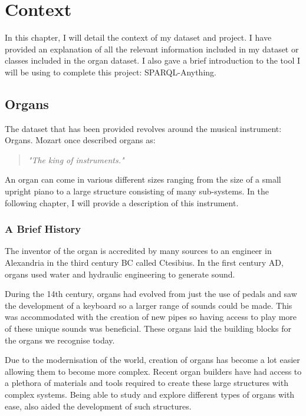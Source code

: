 \chapter{Context}
In this chapter, I will detail the context of my dataset and project. I have provided an explanation of all the relevant information included in my dataset or classes included in the organ dataset. I also gave a brief introduction to the tool I will be using to complete this project: SPARQL-Anything. 

\section{Organs}
\hspace{0.5cm} The dataset that has been provided revolves around the musical instrument: Organs. Mozart once described organs as:

\begin{quote}
    \textit{"The king of instruments."}
\end{quote}

An organ can come in various different sizes ranging from the size of a small upright piano to a large structure consisting of many sub-systems. In the following chapter, I will provide a description of this instrument.

\subsection{A Brief History}
\hspace{0.5cm} 
The inventor of the organ is accredited by many sources to an engineer in Alexandria in the third century BC called Ctesibius. In the first century AD, organs used water and hydraulic engineering to generate sound. \cite{organhistory}

During the 14th century, organs had evolved from just the use of pedals and saw the development of a keyboard so a larger range of sounds could be made. This was accommodated with the creation of new pipes so having access to play more of these unique sounds was beneficial. These organs laid the building blocks for the organs we recognise today. \cite{organmedivalhistory}

Due to the modernisation of the world, creation of organs has become a lot easier allowing them to become more complex. Recent organ builders have had access to a plethora of materials and tools required to create these large structures with complex systems. Being able to study and explore different types of organs with ease, also aided the development of such structures.  \cite{organhistory1}

